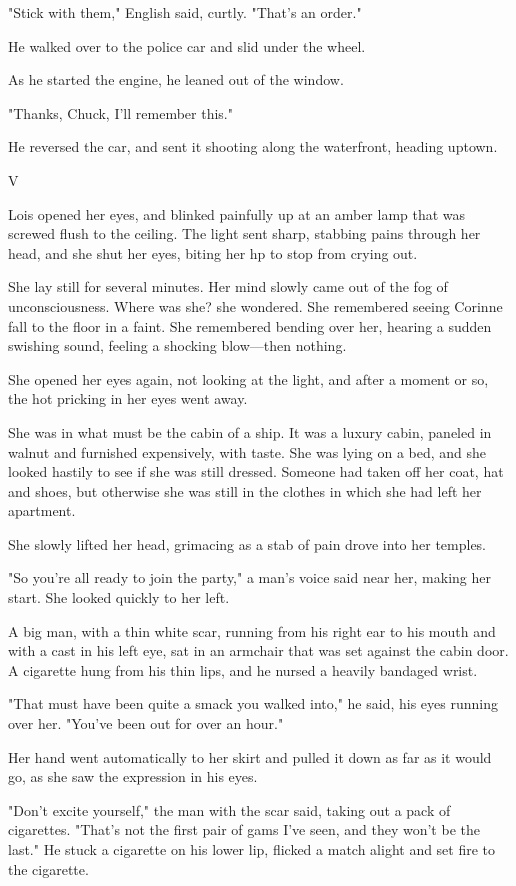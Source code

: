 \documentclass{novel}
\begin{document}
"Stick with them," English said, curtly. "That's an order."

He walked over to the police car and slid under the wheel.

As he started the engine, he leaned out of the window.

"Thanks, Chuck, I'll remember this."

He reversed the car, and sent it shooting along the waterfront, heading uptown.



V

Lois opened her eyes, and blinked painfully up at an amber lamp that was screwed flush to the ceiling. The light sent sharp, stabbing pains through her head, and she shut her eyes, biting her hp to stop from crying out.

She lay still for several minutes. Her mind slowly came out of the fog of unconsciousness. Where was she? she wondered. She remembered seeing Corinne fall to the floor in a faint. She remembered bending over her, hearing a sudden swishing sound, feeling a shocking blow—then nothing.

She opened her eyes again, not looking at the light, and after a moment or so, the hot pricking in her eyes went away.

She was in what must be the cabin of a ship. It was a luxury cabin, paneled in walnut and furnished expensively, with taste. She was lying on a bed, and she looked hastily to see if she was still dressed. Someone had taken off her coat, hat and shoes, but otherwise she was still in the clothes in which she had left her apartment.

She slowly lifted her head, grimacing as a stab of pain drove into her temples.

"So you're all ready to join the party," a man's voice said near her, making her start. She looked quickly to her left.

A big man, with a thin white scar, running from his right ear to his mouth and with a cast in his left eye, sat in an armchair that was set against the cabin door. A cigarette hung from his thin lips, and he nursed a heavily bandaged wrist.

"That must have been quite a smack you walked into," he said, his eyes running over her. "You've been out for over an hour."

Her hand went automatically to her skirt and pulled it down as far as it would go, as she saw the expression in his eyes.

"Don't excite yourself," the man with the scar said, taking out a pack of cigarettes. "That's not the first pair of gams I've seen, and they won't be the last." He stuck a cigarette on his lower lip, flicked a match alight and set fire to the cigarette.
\end{document}
